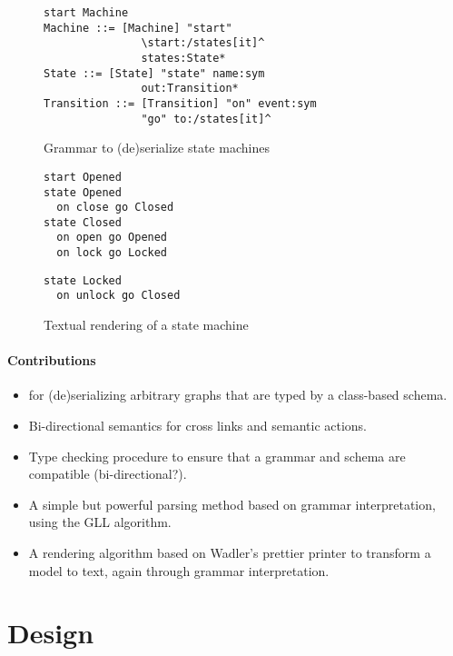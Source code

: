 \documentclass[preprint,10pt]{sigplanconf}
\begin{document}
\begin{figure}
\begin{lstlisting}[language=ensogrammar]
start Machine
Machine ::= [Machine] "start" 
               \start:/states[it]^ 
               states:State*
State ::= [State] "state" name:sym 
               out:Transition*
Transition ::= [Transition] "on" event:sym 
               "go" to:/states[it]^
\end{lstlisting}
\caption{Grammar to (de)serialize state machines}
\end{figure}

\begin{figure}
\begin{minipage}[t]{0.5\linewidth}
\begin{lstlisting}[language=ensostm]
start Opened
state Opened
  on close go Closed
state Closed
  on open go Opened
  on lock go Locked
\end{lstlisting}
\end{minipage}
\begin{minipage}[t]{0.4\linewidth}
\begin{lstlisting}[language=ensostm]
state Locked
  on unlock go Closed
\end{lstlisting}
\end{minipage}
\caption{Textual rendering of a state machine}
\end{figure}

\paragraph{Contributions}

\begin{itemize}
\item \ensogrammars for (de)serializing arbitrary graphs that
  are typed by a class-based schema.
\item Bi-directional semantics for cross links and semantic actions.
\item Type checking procedure to ensure that a grammar and schema are
  compatible (bi-directional?).
\item A simple but powerful parsing method based on grammar
  interpretation, using the GLL algorithm.
\item A rendering algorithm based on Wadler's prettier printer to
  transform a model to text, again through grammar interpretation.
\end{itemize}

\section{Design}
\end{document}
